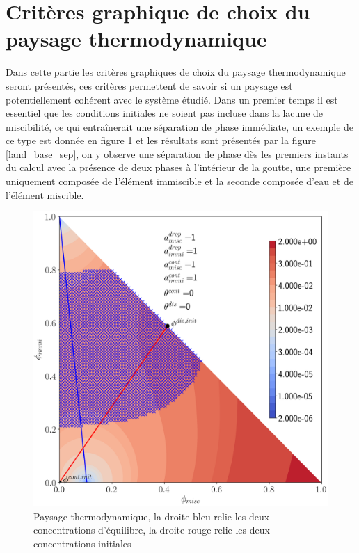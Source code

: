 \section{Critères graphique de choix du paysage thermodynamique}
Dans cette partie les critères graphiques de choix du paysage thermodynamique seront présentés, ces critères permettent de savoir si un paysage est potentiellement cohérent avec le système étudié.
Dans un premier temps il est essentiel que les conditions initiales ne soient pas incluse dans la lacune de miscibilité, ce qui entraînerait une séparation de phase immédiate, un exemple de ce type est donnée en figure \ref{fig:landscapebase} et les résultats sont présentés par la figure \ref{land_base_sep}, on y observe une séparation de phase dès les premiers instants du calcul avec la présence de deux phases à l'intérieur de la goutte, une première uniquement composée de l'élément immiscible et la seconde composée d'eau et de l'élément miscible.
 \begin{figure}[H]
 	\centering
 	\includegraphics[width=0.4\linewidth]{figure/landscape_base.png}
 	\caption[Paysage thermodynamique]{Paysage thermodynamique, la droite bleu relie les deux  concentrations d'équilibre, la droite rouge relie les deux concentrations initiales}
 	\label{fig:landscapebase}
 \end{figure}
\vspace{-0.5cm}
